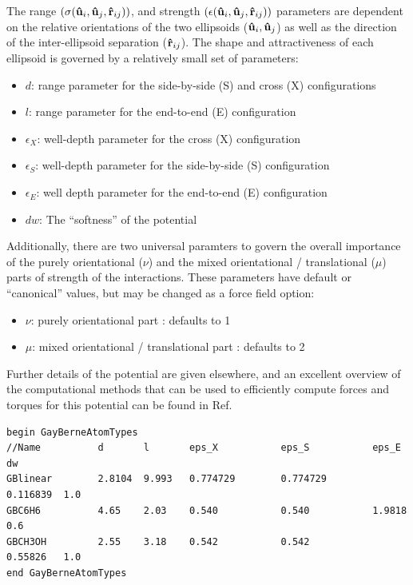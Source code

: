 \documentclass[]{book}
\begin{document}
The range $(\sigma({\bf \hat{u}}_{i},{\bf \hat{u}}_{j},{\bf
\hat{r}}_{ij}))$, and strength $(\epsilon({\bf \hat{u}}_{i},{\bf
\hat{u}}_{j},{\bf \hat{r}}_{ij}))$ parameters 
are dependent on the relative orientations of the two ellipsoids (${\bf
\hat{u}}_{i},{\bf \hat{u}}_{j}$) as well as the direction of the
inter-ellipsoid separation (${\bf \hat{r}}_{ij}$).  The shape and
attractiveness of each ellipsoid is governed by a relatively small set
of parameters: 
\begin{itemize}
\item  $d$:  range parameter for the side-by-side (S) and cross (X) configurations
\item  $l$:  range parameter for the end-to-end (E) configuration
\item  $\epsilon_X$:  well-depth parameter for the cross (X) configuration
\item  $\epsilon_S$:  well-depth parameter for the side-by-side (S) configuration
\item  $\epsilon_E$:  well depth parameter for the end-to-end (E) configuration
\item  $dw$: The ``softness'' of the potential
\end{itemize}
Additionally, there are two universal paramters to govern the overall
importance of the purely orientational ($\nu$) and the mixed
orientational / translational ($\mu$) parts of strength of the
interactions.  These parameters have default or ``canonical'' values,
but may be changed as a force field option:
\begin{itemize}
  \item $\nu$: purely orientational part : defaults to 1
  \item $\mu$: mixed orientational / translational part : defaults to
    2
\end{itemize}
Further details of the potential are given
elsewhere,\cite{Luckhurst:1990fy,Golubkov06,SunX._jp0762020} and an
excellent overview of the computational methods that can be used to
efficiently compute forces and torques for this potential can be found
in Ref. \citealp{Golubkov06}

\begin{lstlisting}[caption={[An example of a GayBerneAtomTypes block.] A
simple example of a GayBerneAtomTypes block.  Distances ($d$ and $l$)
are given in \AA\ and energies ($\epsilon_X, \epsilon_S, \epsilon_E$)
are in units of kcal/mol. $dw$ is unitless.},
label={sch:GayBerneAtomTypes}]
begin GayBerneAtomTypes
//Name          d       l       eps_X           eps_S           eps_E     dw
GBlinear        2.8104  9.993   0.774729        0.774729        0.116839  1.0
GBC6H6          4.65    2.03    0.540           0.540           1.9818    0.6
GBCH3OH         2.55    3.18    0.542           0.542           0.55826   1.0
end GayBerneAtomTypes                   
\end{lstlisting}
\end{document}
